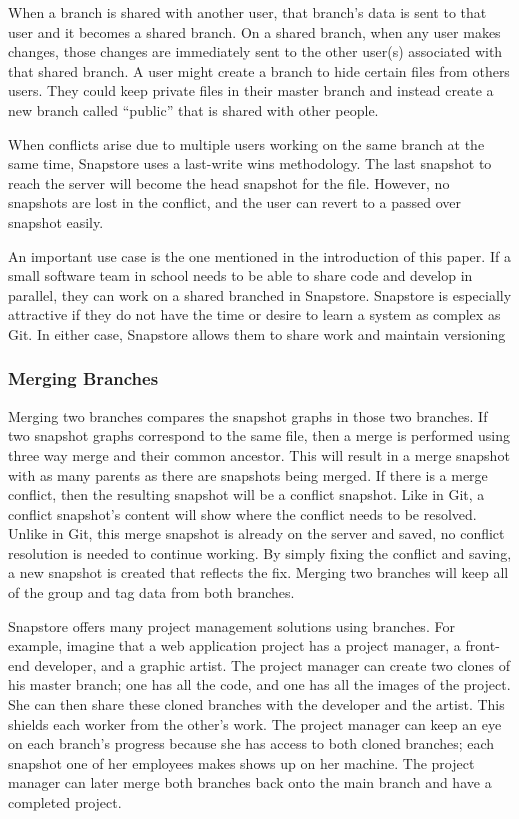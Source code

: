 When a branch is shared with another user, that branch's data is sent to that user and it becomes a shared branch. On a shared branch, when any user makes changes, those changes are immediately sent to the other user(s) associated with that shared branch. A user might create a branch to hide certain files from others users. They could keep private files in their master branch and instead create a new branch called ``public'' that is shared with other people.

When conflicts arise due to multiple users working on the same branch at the same time, Snapstore uses a last-write wins methodology. The last snapshot to reach the server will become the head snapshot for the file. However, no snapshots are lost in the conflict, and the user can revert to a passed over snapshot easily.

An important use case is the one mentioned in the introduction of this paper. If a small software team in school needs to be able to share code and develop in parallel, they can work on a shared branched in Snapstore. Snapstore is especially attractive if they do not have the time or desire to learn a system as complex as Git. In either case, Snapstore allows them to share work and maintain versioning

\subsubsection{Merging Branches}

Merging two branches compares the snapshot graphs in those two branches. If two snapshot graphs correspond to the same file, then a merge is performed using three way merge and their common ancestor. This will result in a merge snapshot with as many parents as there are snapshots being merged. If there is a merge conflict, then the resulting snapshot will be a conflict snapshot. Like in Git, a conflict snapshot's content will show where the conflict needs to be resolved. Unlike in Git, this merge snapshot is already on the server and saved, no conflict resolution is needed to continue working. By simply fixing the conflict and saving, a new snapshot is created that reflects the fix. Merging two branches will keep all of the group and tag data from both branches.

Snapstore offers many project management solutions using branches. For example, imagine that a web application project has a project manager, a front-end developer, and a graphic artist. The project manager can create two clones of his master branch; one has all the code, and one has all the images of the project. She can then share these cloned branches with the developer and the artist. This shields each worker from the other's work. The project manager can keep an eye on each branch's progress because she has access to both cloned branches; each snapshot one of her employees makes shows up on her machine. The project manager can later merge both branches back onto the main branch and have a completed project.

